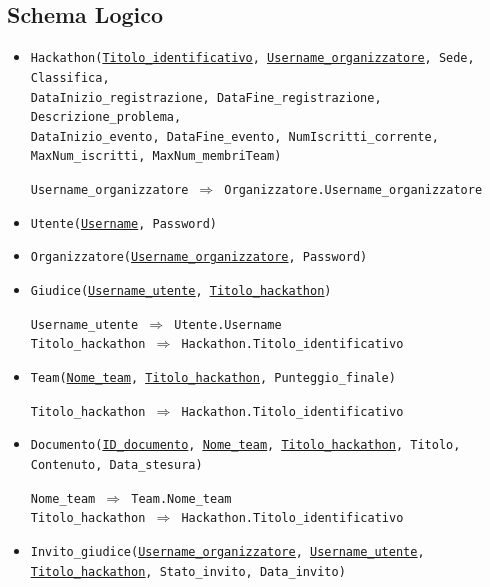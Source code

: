 \documentclass[a4paper, 10pt]{article}
\begin{document}
	\subsection{Schema Logico}
	\begin{itemize}
		\item \texttt{Hackathon(\underline{Titolo\_identificativo}, \underline{\underline{Username\_organizzatore}}, Sede, Classifica,\\
			DataInizio\_registrazione, DataFine\_registrazione, Descrizione\_problema, 
			\\DataInizio\_evento, DataFine\_evento, NumIscritti\_corrente, MaxNum\_iscritti, MaxNum\_membriTeam)}
		\begin{graybox}
			\texttt{Username\_organizzatore $\Rightarrow$ Organizzatore.Username\_organizzatore}
		\end{graybox}
		\item \texttt{Utente(\underline{Username}, Password)}
		\item \texttt{Organizzatore(\underline{Username\_organizzatore}, Password)}
		\item \texttt{Giudice(\underline{\underline{Username\_utente}}, \underline{\underline{Titolo\_hackathon}})}
		\begin{graybox}
			\texttt{Username\_utente $\Rightarrow$ Utente.Username}\\
			\texttt{Titolo\_hackathon $\Rightarrow$ Hackathon.Titolo\_identificativo}
		\end{graybox}
		\item \texttt{Team(\underline{Nome\_team}, \underline{\underline{Titolo\_hackathon}}, Punteggio\_finale)}
		\begin{graybox}
			\texttt{Titolo\_hackathon $\Rightarrow$ Hackathon.Titolo\_identificativo}
		\end{graybox}
		\item \texttt{Documento(\underline{ID\_documento}, \underline{\underline{Nome\_team}}, \underline{\underline{Titolo\_hackathon}}, Titolo,\\Contenuto, Data\_stesura)}
		\begin{graybox}
			\texttt{Nome\_team $\Rightarrow$ Team.Nome\_team}\\
			\texttt{Titolo\_hackathon $\Rightarrow$ Hackathon.Titolo\_identificativo}
		\end{graybox}
		\item \texttt{Invito\_giudice(\underline{\underline{Username\_organizzatore}}, \underline{\underline{Username\_utente}}, \underline{\underline{Titolo\_hackathon}}, Stato\_invito, Data\_invito)}

\end{itemize}
\end{document}

